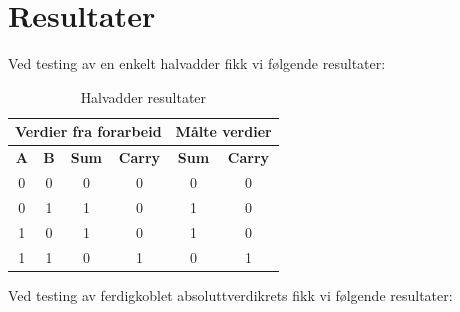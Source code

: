\section{Resultater}
Ved testing av en enkelt halvadder fikk vi følgende resultater:

\begin{table}[!htb]
    \centering
    \caption{Halvadder resultater}
    \label{halvadder}
    \begin{tabular}{|c|c|c|c|c|c|}
        \hline
        \multicolumn{4}{|c|}{\textbf{Verdier fra forarbeid}} & \multicolumn{2}{c|}{\textbf{Målte verdier}} \\ \hline
        \textbf{A}    & \textbf{B} & \textbf{Sum}  & \textbf{Carry}  & \textbf{Sum}  & \textbf{Carry}\\ \hline
        0             & 0 & 0 & 0 &  0  & 0 \\ \hline
        0             & 1 & 1 & 0 &  1  & 0 \\ \hline
        1             & 0 & 1 & 0 &  1  & 0 \\ \hline
        1             & 1 & 0 & 1 &  0  & 1 \\ \hline
    \end{tabular}
\end{table}

Ved testing av ferdigkoblet absoluttverdikrets fikk vi følgende resultater:

